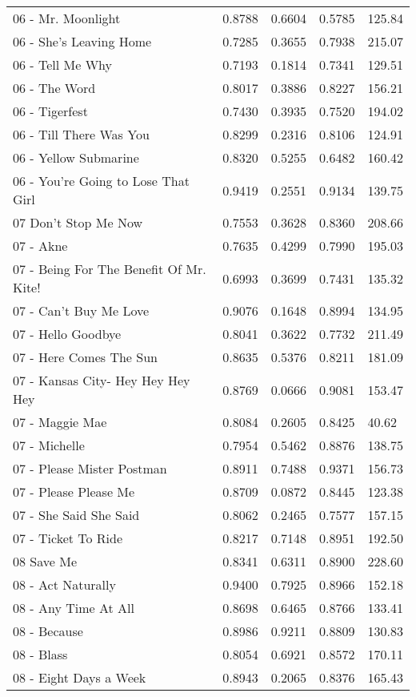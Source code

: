 \begin{longtable}[c]{|p{8cm}|c|l|l|l|}
06 - Mr. Moonlight & 0.8788 & 0.6604 & 0.5785 & 125.84 \\
06 - She's Leaving Home & 0.7285 & 0.3655 & 0.7938 & 215.07 \\
06 - Tell Me Why & 0.7193 & 0.1814 & 0.7341 & 129.51 \\
06 - The Word & 0.8017 & 0.3886 & 0.8227 & 156.21 \\
06 - Tigerfest & 0.7430 & 0.3935 & 0.7520 & 194.02 \\
06 - Till There Was You & 0.8299 & 0.2316 & 0.8106 & 124.91 \\
06 - Yellow Submarine & 0.8320 & 0.5255 & 0.6482 & 160.42 \\
06 - You're Going to Lose That Girl & 0.9419 & 0.2551 & 0.9134 & 139.75 \\
07 Don't Stop Me Now & 0.7553 & 0.3628 & 0.8360 & 208.66 \\
07 - Akne & 0.7635 & 0.4299 & 0.7990 & 195.03 \\
07 - Being For The Benefit Of Mr. Kite! & 0.6993 & 0.3699 & 0.7431 & 135.32 \\
07 - Can't Buy Me Love & 0.9076 & 0.1648 & 0.8994 & 134.95 \\
07 - Hello Goodbye & 0.8041 & 0.3622 & 0.7732 & 211.49 \\
07 - Here Comes The Sun & 0.8635 & 0.5376 & 0.8211 & 181.09 \\
07 - Kansas City- Hey  Hey  Hey  Hey & 0.8769 & 0.0666 & 0.9081 & 153.47 \\
07 - Maggie Mae & 0.8084 & 0.2605 & 0.8425 & 40.62 \\
07 - Michelle & 0.7954 & 0.5462 & 0.8876 & 138.75 \\
07 - Please Mister Postman & 0.8911 & 0.7488 & 0.9371 & 156.73 \\
07 - Please Please Me & 0.8709 & 0.0872 & 0.8445 & 123.38 \\
07 - She Said She Said & 0.8062 & 0.2465 & 0.7577 & 157.15 \\
07 - Ticket To Ride & 0.8217 & 0.7148 & 0.8951 & 192.50 \\
08 Save Me & 0.8341 & 0.6311 & 0.8900 & 228.60 \\
08 - Act Naturally & 0.9400 & 0.7925 & 0.8966 & 152.18 \\
08 - Any Time At All & 0.8698 & 0.6465 & 0.8766 & 133.41 \\
08 - Because & 0.8986 & 0.9211 & 0.8809 & 130.83 \\
08 - Blass & 0.8054 & 0.6921 & 0.8572 & 170.11 \\
08 - Eight Days a Week & 0.8943 & 0.2065 & 0.8376 & 165.43 \\

\end{longtable}
